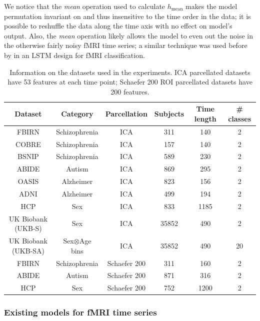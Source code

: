 \documentclass[final,5p,times,twocolumn,authoryear]{elsarticle}
\begin{document}
We notice that the \emph{mean} operation used to calculate $h_\text{mean}$ makes the model permutation invariant on and thus insensitive to the time order in the data; it is possible to reshuffle the data along the time axis with no effect on model's output. Also, the \emph{mean} operation likely allows the model to even out the noise in the otherwise fairly noisy fMRI time series; a similar technique was used before by \citet{dvornek} in an LSTM design for fMRI classification.

\begin{table}[h]
\caption{Information on the datasets used in the experiments. ICA parcellated datasets have 53 features at each time point; Schaefer 200 ROI parcellated datasets have 200 features.}
\centering
\begin{tabular}{c|c|c|c|c|c}
\toprule
Dataset & Category & Parcellation & Subjects & Time length & \# classes \\ \midrule
FBIRN \citep{fbirn} & Schizophrenia & ICA  & 311  & 140 & 2 \\
COBRE \citep{cobre} & Schizophrenia & ICA & 157 & 140 & 2 \\
BSNIP \citep{bsnip} & Schizophrenia & ICA & 589 & 230 & 2 \\
ABIDE \citep{abide} & Autism & ICA & 869 & 295 & 2 \\
OASIS \citep{oasis} & Alzheimer & ICA & 823 & 156 & 2 \\ 
ADNI \citep{adni} &  Alzheimer & ICA & 499 & 194 & 2 \\
HCP \citep{hcp} & Sex & ICA & 833 & 1185 & 2 \\
UK Biobank (UKB-S) & Sex & ICA & 35852 & 490 & 2 \\
UK Biobank (UKB-SA) & Sex$\otimes$Age bins & ICA & 35852 & 490 & 20 \\
\midrule
FBIRN & Schizophrenia & Schaefer 200  & 311  & 160 & 2 \\
ABIDE & Autism & Schaefer 200 & 871 & 316 & 2 \\
HCP & Sex & Schaefer 200 & 752 & 1200 & 2 \\ 
\bottomrule
\end{tabular}
\label{tab:datasets}
\end{table}

\subsubsection{Existing models for fMRI time series}\label{sec:ts_models}
\end{document}
